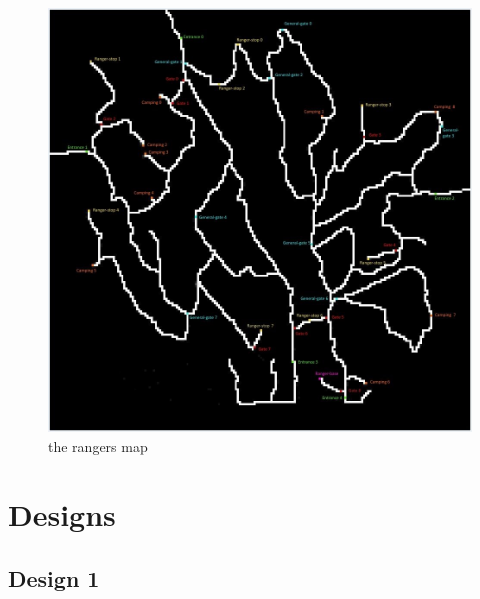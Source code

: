\documentclass{article}
\begin{document}
\begin{itemize}
	\begin{figure}
		\centering
		\includegraphics[scale=0.4]{Lekagul_Roadways_labeled_v2.jpg}
		\caption{the rangers map}
		\label{fig:map}
	\end{figure}	

\end{itemize}

\section{Designs}
\subsection*{Design 1} 
\end{document}
